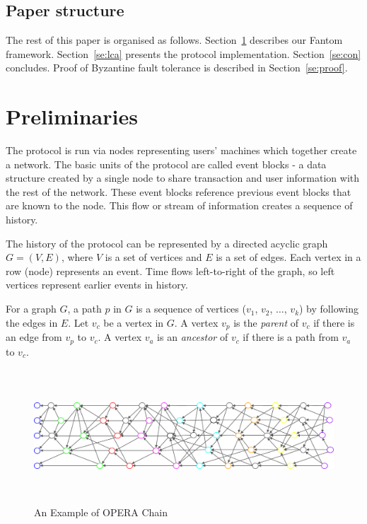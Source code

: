 \documentclass{article}
\begin{document}
\subsection{Paper structure}

The rest of this paper is organised as follows.
Section~\ref{se:prelim} describes our Fantom framework.
Section~\ref{se:lca} presents the protocol implementation.
Section~\ref{se:con} concludes.
Proof of Byzantine fault tolerance is described in Section~\ref{se:proof}.


\section{Preliminaries}\label{se:prelim}

The protocol is run via nodes representing users' machines which together create a network. The basic units of the protocol are called event blocks - a data structure created by a single node to share transaction and user information with the rest of the network. These event blocks reference previous event blocks that are known to the node. This flow or stream of information creates a sequence of history.

The history of the protocol can be represented by a directed acyclic graph $G=(V, E)$, where $V$ is a set of vertices and $E$ is a set of edges. Each vertex in a row (node) represents an event. Time flows left-to-right of the graph, so left vertices represent earlier events in history. 

For a graph $G$, a path $p$ in $G$ is a sequence  of vertices ($v_1$, $v_2$, $\dots$, $v_k$) by following the edges in $E$.
Let $v_c$ be a vertex in $G$.
A vertex $v_p$ is the \emph{parent} of $v_c$ if there is an edge from $v_p$ to $v_c$.
A vertex $v_a$ is an \emph{ancestor} of $v_c$ if there is a path from $v_a$ to $v_c$.

\begin{figure}[H] \centering
\includegraphics[height=5cm, width=1.0\columnwidth]{OPERA_chain.pdf}
\caption{An Example of OPERA Chain}
\label{fig:operachain}
\end{figure}
\end{document}
